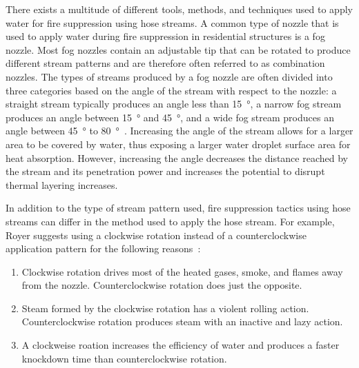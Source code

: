 \documentclass[12pt,oneside]{book}
\begin{document}
There exists a multitude of different tools, methods, and techniques used to apply water for fire suppression using hose streams. A common type of nozzle that is used to apply water during fire suppression in residential structures is a fog nozzle. Most fog nozzles contain an adjustable tip that can be rotated to produce different stream patterns and are therefore often referred to as combination nozzles. The types of streams produced by a fog nozzle are often divided into three categories based on the angle of the stream with respect to the nozzle: a straight stream typically produces an angle less than 15\SI{}{\degree}, a narrow fog stream produces an angle between 15\SI{}{\degree} and 45\SI{}{\degree}, and a wide fog stream produces an angle between 45\SI{}{\degree} to 80\SI{}{\degree}~\cite{Essentials_FF}. Increasing the angle of the stream allows for a larger area to be covered by water, thus exposing a larger water droplet surface area for heat absorption. However, increasing the angle decreases the distance reached by the stream and its penetration power and increases the potential to disrupt thermal layering increases. 

In addition to the type of stream pattern used, fire suppression tactics using hose streams can differ in the method used to apply the hose stream. For example, Royer suggests using a clockwise rotation instead of a counterclockwise application pattern for the following reasons~\cite{Royer}:
\begin{enumerate} 
	\item Clockwise rotation drives most of the heated gases, smoke, and flames away from the nozzle. Counterclockwise rotation does just the opposite.
	\item Steam formed by the clockwise rotation has a violent rolling action. Counterclockwise rotation produces steam with an inactive and lazy action.
	\item A clockweise roation increases the efficiency of water and produces a faster knockdown time than counterclockwise rotation.
\end{enumerate}
\end{document}
